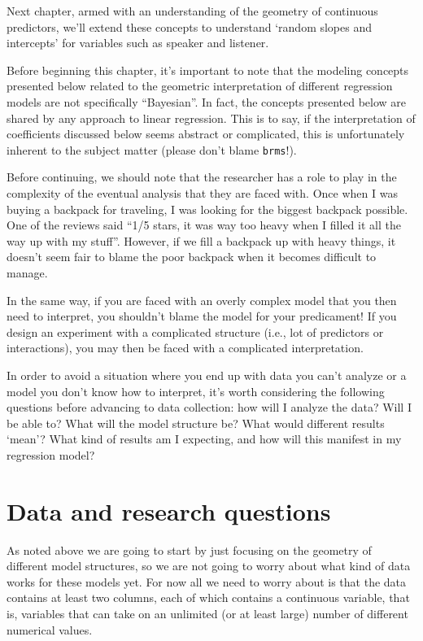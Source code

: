 \documentclass[
]{book}
\begin{document}
Next chapter, armed with an understanding of the geometry of continuous predictors, we'll extend these concepts to understand `random slopes and intercepts' for variables such as speaker and listener.

Before beginning this chapter, it's important to note that the modeling concepts presented below related to the geometric interpretation of different regression models are not specifically ``Bayesian''. In fact, the concepts presented below are shared by any approach to linear regression. This is to say, if the interpretation of coefficients discussed below seems abstract or complicated, this is unfortunately inherent to the subject matter (please don't blame \texttt{brms}!).

Before continuing, we should note that the researcher has a role to play in the complexity of the eventual analysis that they are faced with. Once when I was buying a backpack for traveling, I was looking for the biggest backpack possible. One of the reviews said ``1/5 stars, it was way too heavy when I filled it all the way up with my stuff''. However, if we fill a backpack up with heavy things, it doesn't seem fair to blame the poor backpack when it becomes difficult to manage.

In the same way, if you are faced with an overly complex model that you then need to interpret, you shouldn't blame the model for your predicament! If you design an experiment with a complicated structure (i.e., lot of predictors or interactions), you may then be faced with a complicated interpretation.

In order to avoid a situation where you end up with data you can't analyze or a model you don't know how to interpret, it's worth considering the following questions before advancing to data collection: how will I analyze the data? Will I be able to? What will the model structure be? What would different results `mean'? What kind of results am I expecting, and how will this manifest in my regression model?

\hypertarget{data-and-research-questions-4}{%
\section{Data and research questions}\label{data-and-research-questions-4}}

As noted above we are going to start by just focusing on the geometry of different model structures, so we are not going to worry about what kind of data works for these models yet. For now all we need to worry about is that the data contains at least two columns, each of which contains a continuous variable, that is, variables that can take on an unlimited (or at least large) number of different numerical values.
\end{document}
